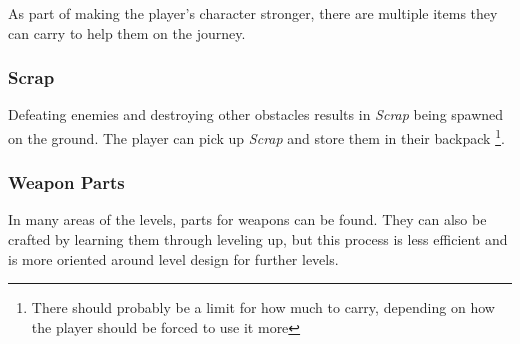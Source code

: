\documentclass[../Main.tex]{subfiles}
\begin{document}
As part of making the player's character stronger, there are multiple items they can carry to help them on the journey.

\subsubsection{Scrap}

Defeating enemies and destroying other obstacles results in \emph{Scrap} being spawned on the ground. The player can pick up \emph{Scrap} and store them in their backpack \footnote{There should probably be a limit for how much to carry, depending on how the player should be forced to use it more}. 

\subsubsection{Weapon Parts}

In many areas of the levels, parts for weapons can be found. They can also be crafted by learning them through leveling up, but this process is less efficient and is more oriented around level design for further levels.
\end{document}
